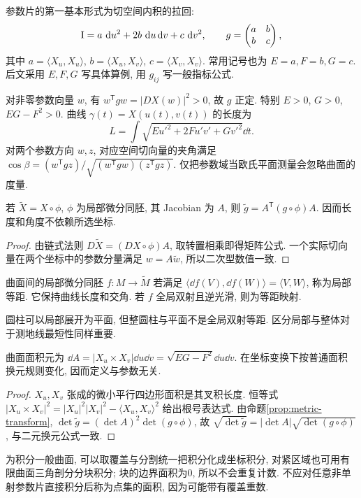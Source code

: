 \begin{definition}
参数片的第一基本形式为切空间内积的拉回:
\[
 \mathrm{I}=a\,\,\mathrm d u^2+2b\,\,\mathrm d u\,\mathrm d v+c\,\,\mathrm d v^2,\qquad
 g=\begin{pmatrix}a&b\\b&c\end{pmatrix},
\]
其中 $a=\langle X_u,X_u\rangle$, $b=\langle X_u,X_v\rangle$, $c=\langle X_v,X_v\rangle$. 常用记号也为 $E=a,F=b,G=c$. 后文采用 $E,F,G$ 写具体算例, 用 $g_{ij}$ 写一般指标公式.
\end{definition}
对非零参数向量 $w$, 有 $w^{\mathsf T}gw=|DX(w)|^2>0$, 故 $g$ 正定. 特别 $E>0$, $G>0$, $EG-F^2>0$. 曲线 $\gamma(t)=X(u(t),v(t))$ 的长度为
\[
 L=\int\sqrt{E u'^2+2F u'v'+Gv'^2}\dd t.
\]
对两个参数方向 $w,z$, 对应空间切向量的夹角满足 $\cos\beta=(w^{\mathsf T}gz)/\sqrt{(w^{\mathsf T}gw)(z^{\mathsf T}gz)}$. 仅把参数域当欧氏平面测量会忽略曲面的度量.
\begin{proposition}\label{prop:metric-transform}
若 $\widetilde X=X\circ\phi$, $\phi$ 为局部微分同胚, 其 Jacobian 为 $A$, 则 $\widetilde g=A^{\mathsf T}(g\circ\phi)A$. 因而长度和角度不依赖所选坐标.
\end{proposition}
\begin{proof}
由链式法则 $D\widetilde X=(DX\circ\phi)A$, 取转置相乘即得矩阵公式. 一个实际切向量在两个坐标中的参数分量满足 $w=A\widetilde w$, 所以二次型数值一致.
\end{proof}
\begin{definition}
曲面间的局部微分同胚 $f:M\to\widetilde M$ 若满足 $\langle\dd f(V),\dd f(W)\rangle=\langle V,W\rangle$, 称为局部等距. 它保持曲线长度和交角. 若 $f$ 全局双射且逆光滑, 则为等距映射.
\end{definition}
圆柱可以局部展开为平面, 但整圆柱与平面不是全局双射等距. 区分局部与整体对于测地线最短性同样重要.
\begin{proposition}\label{prop:area}
曲面面积元为 $\dd A=|X_u\times X_v|\dd u\dd v=\sqrt{EG-F^2}\dd u\dd v$. 在坐标变换下按普通面积换元规则变化, 因而定义与参数无关.
\end{proposition}
\begin{proof}
$X_u,X_v$ 张成的微小平行四边形面积是其叉积长度. 恒等式 $|X_u\times X_v|^2=|X_u|^2|X_v|^2-\langle X_u,X_v\rangle^2$ 给出根号表达式. 由命题\ref{prop:metric-transform}, $\det\widetilde g=(\det A)^2\det(g\circ\phi)$, 故 $\sqrt{\det\widetilde g}=|\det A|\sqrt{\det(g\circ\phi)}$, 与二元换元公式一致.
\end{proof}
为积分一般曲面, 可以取覆盖与分割统一把积分化成坐标积分, 对紧区域也可用有限曲面三角剖分分块积分; 块的边界面积为0, 所以不会重复计数. 不应对任意非单射参数片直接积分后称为点集的面积, 因为可能带有覆盖重数.
